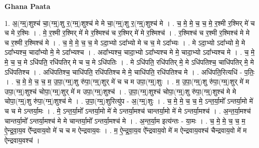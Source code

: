 \documentclass[17pt]{extarticle}
\begin{document}
\textbf{Ghana Paata } \newline

1. अ॒(ग्म्॒)शुश्च॑ चा॒(ग्म्॒)शु र॒(ग्म्॒)शुश्च॑ मे मे चा॒(ग्म्॒)शु र॒(ग्म्॒)शुश्च॑ मे । . च॒ मे॒ मे॒ च॒ च॒ मे॒ र॒श्मी र॒श्मिर् मे॑ च च मे र॒श्मिः । . मे॒ र॒श्मी र॒श्मिर् मे॑ मे र॒श्मिश्च॑ च र॒श्मिर् मे॑ मे र॒श्मिश्च॑ । . र॒श्मिश्च॑ च र॒श्मी र॒श्मिश्च॑ मे मे च र॒श्मी र॒श्मिश्च॑ मे । . च॒ मे॒ मे॒ च॒ च॒ मे ऽदा॒भ्यो ऽदा᳚भ्यो मे च च॒ मे ऽदा᳚भ्यः । . मे ऽदा॒भ्यो ऽदा᳚भ्यो मे॒ मे ऽदा᳚भ्यश्च॒ चादा᳚भ्यो मे॒ मे ऽदा᳚भ्यश्च । . अदा᳚भ्यश्च॒ चादा॒भ्यो ऽदा᳚भ्यश्च मे मे॒ चादा॒भ्यो ऽदा᳚भ्यश्च मे । . च॒ मे॒ मे॒ च॒ च॒ मे ऽधि॑पति॒ रधि॑पतिर् मे च च॒ मे ऽधि॑पतिः । . मे ऽधि॑पति॒ रधि॑पतिर् मे॒ मे ऽधि॑पतिश्च॒ चाधि॑पतिर् मे॒ मे ऽधि॑पतिश्च । . अधि॑पतिश्च॒ चाधि॑पति॒ रधि॑पतिश्च मे मे॒ चाधि॑पति॒ रधि॑पतिश्च मे । . अधि॑पति॒रित्यधि॑ - प॒तिः॒ । . च॒ मे॒ मे॒ च॒ च॒ म॒ उ॒पा॒(ग्म्॒)शु रु॑पा॒(ग्म्॒)शुर् मे॑ च च म उपा॒(ग्म्॒)शुः । . म॒ उ॒पा॒(ग्म्॒)शु रु॑पा॒(ग्म्॒)शुर् मे॑ म उपा॒(ग्म्॒)शुश्च॑ चोपा॒(ग्म्॒)शुर् मे॑ म उपा॒(ग्म्॒)शुश्च॑ । . उ॒पा॒(ग्म्॒)शुश्च॑ चोपा॒(ग्म्॒)शु रु॑पा॒(ग्म्॒)शुश्च॑ मे मे चोपा॒(ग्म्॒)शु रु॑पा॒(ग्म्॒)शुश्च॑ मे । . उ॒पा॒(ग्म्॒)शुरित्यु॑प - अ॒(ग्म्॒)शुः । . च॒ मे॒ मे॒ च॒ च॒ मे॒ ऽन्त॒र्या॒मो᳚ ऽन्तर्या॒मो मे॑ च च मे ऽन्तर्या॒मः । . मे॒ ऽन्त॒र्या॒मो᳚ ऽन्तर्या॒मो मे॑ मे ऽन्तर्या॒मश्च॑ चान्तर्या॒मो मे॑ मे ऽन्तर्या॒मश्च॑ । . अ॒न्त॒र्या॒मश्च॑ चान्तर्या॒मो᳚ ऽन्तर्या॒मश्च॑ मे मे चान्तर्या॒मो᳚ ऽन्तर्या॒मश्च॑ मे । . अ॒न्त॒र्या॒म इत्य॑न्तः - या॒मः । . च॒ मे॒ मे॒ च॒ च॒ म॒ ऐ॒न्द्र॒वा॒य॒व ऐ᳚न्द्रवाय॒वो मे॑ च च म ऐन्द्रवाय॒वः । . म॒ ऐ॒न्द्र॒वा॒य॒व ऐ᳚न्द्रवाय॒वो मे॑ म ऐन्द्रवाय॒वश्च॑ चैन्द्रवाय॒वो मे॑ म ऐन्द्रवाय॒वश्च॑ । \newline
\end{document}
